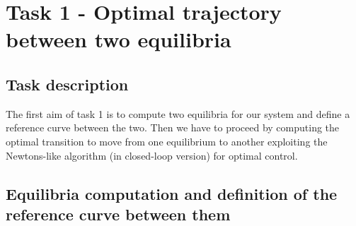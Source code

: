 \documentclass[a4paper,11pt,oneside]{book}
\begin{document}
\chapter{Task 1 - Optimal trajectory between two equilibria}
\section{Task description}
\begin{justify}
    {The first aim of task 1 is to compute two equilibria for our system and define a reference curve between the two. Then we have to proceed by computing the optimal transition to move from one equilibrium to another exploiting the Newton\textquotesingle s-like algorithm (in closed-loop version) for optimal control.}
\end{justify}
\section{Equilibria computation and definition of the reference curve between them}
\end{document}
